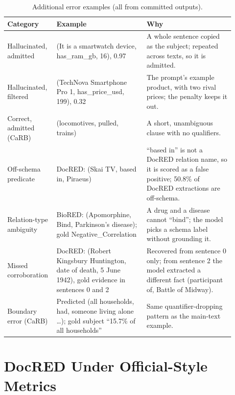 \documentclass[11pt]{article}
\begin{document}
\begin{table}[htbp]
\centering
\caption{Additional error examples (all from committed outputs).}
\label{tab:s9-examples}
\small
\begin{tabular}{@{}p{0.17\linewidth}p{0.38\linewidth}p{0.37\linewidth}@{}}
\toprule
Category & Example & Why \\
\midrule
Hallucinated, admitted & (It is a smartwatch device, has\_ram\_gb, 16), 0.97 & A whole sentence copied as the subject; repeated across texts, so it is admitted. \\
Hallucinated, filtered & (TechNova Smartphone Pro 1, has\_price\_usd, 199), 0.32 & The prompt's example product, with two rival prices; the penalty keeps it out. \\
Correct, admitted (CaRB) & (locomotives, pulled, trains) & A short, unambiguous clause with no qualifiers. \\
Off-schema predicate & DocRED: (Skai TV, based in, Piraeus) & ``based in'' is not a DocRED relation name, so it is scored as a false positive; 50.8\% of DocRED extractions are off-schema. \\
Relation-type ambiguity & BioRED: (Apomorphine, Bind, Parkinson's disease); gold Negative\_Correlation & A drug and a disease cannot ``bind''; the model picks a schema label without grounding it. \\
Missed corroboration & DocRED: (Robert Kingsbury Huntington, date of death, 5 June 1942), gold evidence in sentences 0 and 2 & Recovered from sentence 0 only; from sentence 2 the model extracted a different fact (participant of, Battle of Midway). \\
Boundary error (CaRB) & Predicted (all households, had, someone living alone \ldots); gold subject ``15.7\% of all households'' & Same quantifier-dropping pattern as the main-text example. \\
\bottomrule
\end{tabular}
\end{table}

\section{DocRED Under Official-Style Metrics}
\label{sec:s10}
\end{document}
